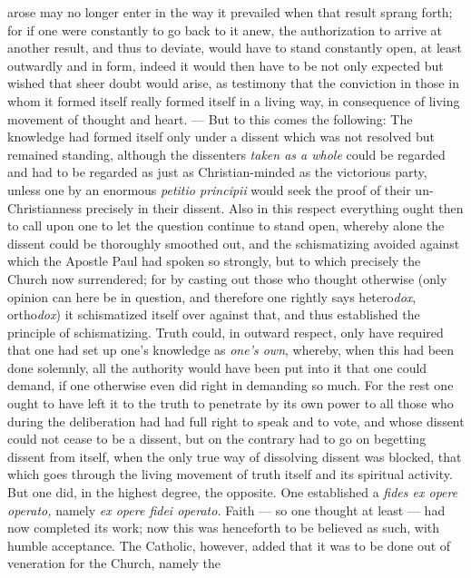 \documentclass[12pt,a4paper,openany]{book}
\newcommand{\opage}[1]{\marginnote{\footnotesize\textit{[#1]}}}
\begin{document}
arose may no longer enter in the way it prevailed when that result sprang forth; for
if one were constantly to go back to it anew, the authorization to arrive at another
result, and thus to deviate, would have to stand constantly open, at least outwardly
and in form, indeed it would then have to be not only expected but wished that sheer
doubt would arise, as testimony that the conviction in those in whom it formed itself
really formed itself in a living way, in consequence of living movement of thought
and heart. --- But to this comes the following: The knowledge had formed itself only
under a dissent which was not resolved but remained standing, although the
dissenters \emph{taken as a whole} could be regarded and had to be regarded as just
as Christian-minded as the victorious party, unless one by an enormous
\textit{petitio principii} would seek the proof of their un-Christianness precisely
in their dissent. Also in this respect everything ought then to call upon one to let
the question continue to stand open, whereby alone the dissent could be thoroughly
smoothed out, and the schismatizing avoided against which the Apostle Paul had
spoken so strongly, but to which precisely the Church now surrendered; for by
casting out those who thought otherwise (only opinion can here be in question, and
therefore one rightly says hetero\emph{dox}, ortho\emph{dox}) it schismatized itself
over against that, and thus established the principle of schismatizing. Truth could,
in outward respect, only have required that one had set up one's knowledge as
\emph{one's own}, whereby, when this had been done solemnly, all the authority would
have been put into it that one could demand, if one otherwise even did right in
\setcounter{footnote}{0}%
\opage{134}demanding so much. For the rest one ought to have left it to the truth to penetrate
by its own power to all those who during the deliberation had had full right to
speak and to vote, and whose dissent could not cease to be a dissent, but on the
contrary had to go on begetting dissent from itself, when the only true way of
dissolving dissent was blocked, that which goes through the living movement of truth
itself and its spiritual activity. But one did, in the highest degree, the opposite.
One established a \textit{fides ex opere operato,} namely \textit{ex opere fidei
operato.} Faith --- so one thought at least --- had now completed its work; now this
was henceforth to be believed as such, with humble acceptance. The Catholic,
however, added that it was to be done out of veneration for the Church, namely the
\end{document}
